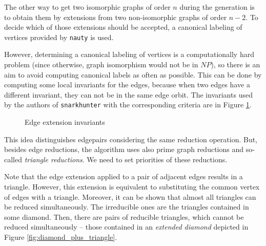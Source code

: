 The other way to get two isomorphic graphs of order $n$ during the generation is to obtain them by extensions from two non-isomorphic graphs of order $n-2$. To decide which of those extensions should be accepted, a canonical labeling of vertices provided by \texttt{nauty} \cite{nauty} is used.

However, determining a canonical labeling of vertices is a computationally hard problem (since otherwise, graph isomorphism would not be in $NP$), so there is an aim to avoid computing canonical labels as often as possible. This can be done by computing some local invariants for the edges, because when two edges have a different invariant, they can not be in the same edge orbit. The invariants used by the authors of \texttt{snarkhunter} with the corresponding criteria are in Figure \ref{fig:snarkhunter_invariants}.
\begin{figure}[h!]
\caption{Edge extension invariants}
\label{fig:snarkhunter_invariants}
\end{figure}

This idea distinguishes edgepairs considering the same reduction operation. But, besides edge reductions, the algorithm uses also prime graph reductions and so-called \emph{triangle reductions}. We need to set priorities of these reductions.

Note that the edge extension applied to a pair of adjacent edges results in a triangle. However, this extension is equivalent to substituting the common vertex of edges with a triangle. Moreover, it can be shown that almost all triangles can be reduced simultaneously. The irreducible ones are the triangles contained in some diamond. Then, there are pairs of reducible triangles, which cannot be reduced simultaneously -- those contained in an \emph{extended diamond} depicted in Figure \ref{fig:diamond_plus_triangle}.

